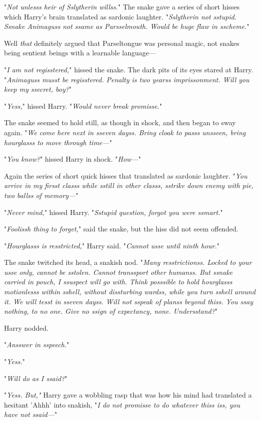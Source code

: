 "\emph{Not unlesss heir of Sslytherin willss.}" The snake gave a series of 
short hisses which Harry's brain translated as sardonic laughter. 
"\emph{Sslytherin not sstupid. Ssnake Animaguss not ssame as Parsselmouth. 
Would be huge flaw in sscheme.}"

Well \emph{that} definitely argued that Parseltongue was personal magic, not 
snakes being sentient beings with a learnable language---

"\emph{I am not regisstered,}" hissed the snake. The dark pits of its eyes 
stared at Harry. "\emph{Animaguss musst be regisstered. Penalty is two yearss 
imprissonment. Will you keep my ssecret, boy?}"

"\emph{Yess,}" hissed Harry. "\emph{Would never break promisse.}"

The snake seemed to hold still, as though in shock, and then began to sway 
again. "\emph{We come here next in sseven dayss. Bring cloak to passs unsseen, 
bring hourglasss to move through time---}"

"\emph{You know?}" hissed Harry in shock. "\emph{How---}"

Again the series of short quick hisses that translated as sardonic laughter. 
"\emph{You arrive in my firsst classs while sstill in other classs, sstrike 
down enemy with pie, two ballss of memory---}"

"\emph{Never mind,}" hissed Harry. "\emph{Sstupid question, forgot you were 
ssmart.}"

"\emph{Foolissh thing to forget,}" said the snake, but the hiss did not seem 
offended.

"\emph{Hourglasss is resstricted,}" Harry said. "\emph{Cannot usse until ninth 
hour.}"

The snake twitched its head, a snakish nod. "\emph{Many resstrictionss. Locked 
to your usse only, cannot be sstolen. Cannot transsport other humanss. But 
ssnake carried in pouch, I ssuspect will go with. Think posssible to hold 
hourglasss motionlesss within sshell, without dissturbing wardss, while you 
turn sshell around it. We will tesst in sseven dayss. Will not sspeak of planss 
beyond thiss. You ssay nothing, to no one. Give no ssign of expectancy, none. 
Undersstand?}"

Harry nodded.

"\emph{Ansswer in sspeech.}"

"\emph{Yess.}"

"\emph{Will do as I ssaid?}"

"\emph{Yess. But,"} Harry gave a wobbling rasp that was how his mind had 
translated a hesitant 'Ahhh' into snakish, "\emph{I do not promisse to do 
whatever thiss iss, you have not ssaid---}"

